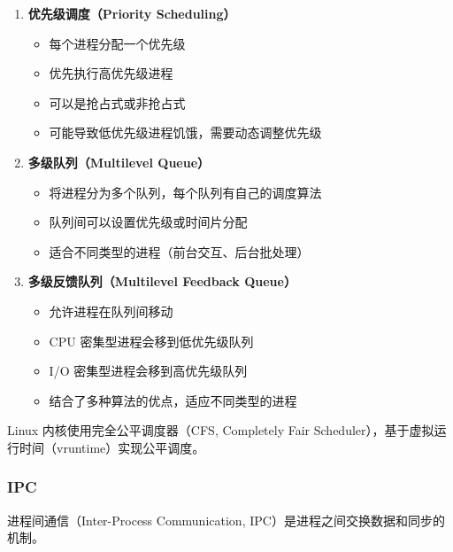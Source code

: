 \begin{enumerate}
  \item \textbf{优先级调度（Priority Scheduling）}
    \begin{itemize}
      \item 每个进程分配一个优先级
      \item 优先执行高优先级进程
      \item 可以是抢占式或非抢占式
      \item 可能导致低优先级进程饥饿，需要动态调整优先级
    \end{itemize}

  \item \textbf{多级队列（Multilevel Queue）}
    \begin{itemize}
      \item 将进程分为多个队列，每个队列有自己的调度算法
      \item 队列间可以设置优先级或时间片分配
      \item 适合不同类型的进程（前台交互、后台批处理）
    \end{itemize}

  \item \textbf{多级反馈队列（Multilevel Feedback Queue）}
    \begin{itemize}
      \item 允许进程在队列间移动
      \item CPU 密集型进程会移到低优先级队列
      \item I/O 密集型进程会移到高优先级队列
      \item 结合了多种算法的优点，适应不同类型的进程
    \end{itemize}
\end{enumerate}

Linux 内核使用完全公平调度器（CFS, Completely Fair Scheduler），基于虚拟运行时间（vruntime）实现公平调度。

\subsubsection{IPC}

进程间通信（Inter-Process Communication, IPC）是进程之间交换数据和同步的机制。


